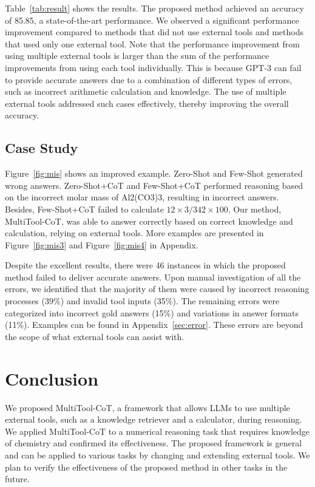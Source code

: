 Table~\ref{tab:result} shows the results.
The proposed method achieved an accuracy of 85.85, a state-of-the-art performance.
We observed a significant performance improvement compared to methods that did not use external tools and methods that used only one external tool.
Note that the performance improvement from using multiple external tools is larger than the sum of the performance improvements from using each tool individually.
This is because GPT-3 can fail to provide accurate answers due to a combination of different types of errors, such as incorrect arithmetic calculation and knowledge.
The use of multiple external tools addressed such cases effectively, thereby improving the overall accuracy.

\subsection{Case Study}
\label{subsection:casestudy}
Figure~\ref{fig:mis} shows an improved example.
Zero-Shot and Few-Shot generated wrong answers.
Zero-Shot+CoT and Few-Shot+CoT performed reasoning based on the incorrect molar mass of Al2(CO3)3, resulting in incorrect answers.
Besides, Few-Shot+CoT failed to calculate $12 \times 3 / 342 \times 100$.
Our method, MultiTool-CoT, was able to answer correctly based on correct knowledge and calculation, relying on external tools.
More examples are presented in Figure~\ref{fig:mis3} and Figure~\ref{fig:mis4} in Appendix.

Despite the excellent results, there were 46 instances in which the proposed method failed to deliver accurate answers.
Upon manual investigation of all the errors, we identified that the majority of them were caused by incorrect reasoning processes (39\%) and invalid tool inputs (35\%).
The remaining errors were categorized into incorrect gold answers (15\%) and variations in answer formats (11\%).
Examples can be found in Appendix~\ref{sec:error}.
These errors are beyond the scope of what external tools can assist with.

\section{Conclusion}
We proposed MultiTool-CoT, a framework that allows LLMs to use multiple external tools, such as a knowledge retriever and a calculator, during reasoning.
We applied MultiTool-CoT to a numerical reasoning task that requires knowledge of chemistry and confirmed its effectiveness.
The proposed framework is general and can be applied to various tasks by changing and extending external tools.
We plan to verify the effectiveness of the proposed method in other tasks in the future.

